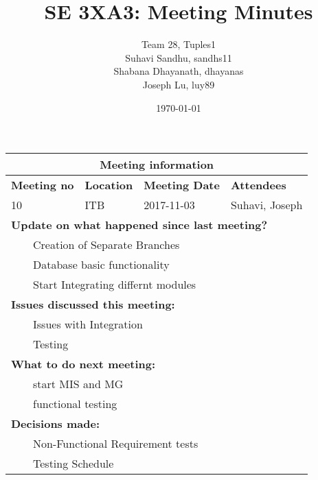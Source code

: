 \documentclass{article}
\title{SE 3XA3: Meeting Minutes}
\author{Team 28, Tuples1
		\\ Suhavi Sandhu, sandhs11
		\\ Shabana Dhayanath, dhayanas
		\\ Joseph Lu, luy89
}
\date{\today}
\newcommand{\tabitem}{~~\llap{\textbullet}~~}
\begin{document}
\begin{tabularx}{\textwidth}{| X || X || X || X |}

    \hline
    \hline
    \multicolumn{4}{|c|}{\textbf{Meeting information}}\\
    \hline
    \hline
        
    \textbf{Meeting no}& \textbf{Location}&\textbf{Meeting Date}&\textbf{Attendees}\\
    
    \hline

    10 & ITB & 2017-11-03 & Suhavi, Joseph\\
    
    \hline

    \multicolumn{4}{|l|}{\textbf{Update on what happened since last meeting?}}\\

    \multicolumn{4}{|l|}{\tabitem Creation of Separate Branches}\\
    \multicolumn{4}{|l|}{\tabitem Database basic functionality}\\
    \multicolumn{4}{|l|}{\tabitem Start Integrating differnt modules}\\

    \hline

    \multicolumn{4}{|l|}{\textbf{Issues discussed this meeting:}}\\
    
    \multicolumn{4}{|l|}{\tabitem Issues with Integration}\\
    \multicolumn{4}{|l|}{\tabitem Testing}\\

    \hline

    \multicolumn{4}{|l|}{\textbf{What to do next meeting:}}\\

    \multicolumn{4}{|l|}{\tabitem start MIS and MG}\\
    \multicolumn{4}{|l|}{\tabitem functional testing}\\

    \hline

    \multicolumn{4}{|l|}{\textbf{Decisions made:}}\\
    
    \multicolumn{4}{|l|}{\tabitem Non-Functional Requirement tests}\\
    \multicolumn{4}{|l|}{\tabitem Testing Schedule}\\

    \hline


\end{tabularx}
\end{document}
